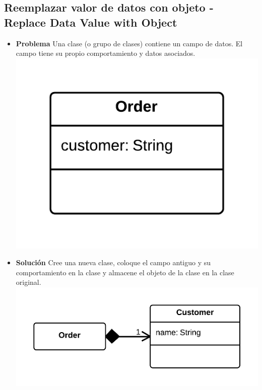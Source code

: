 \documentclass[11pt,a4paper,oneside]{book}
\begin{document}
\subsection{Reemplazar valor de datos con objeto - Replace Data Value with Object}
\label{replacedatavaluewithobject}
\begin{itemize}
    \item \textbf{Problema} Una clase (o grupo de clases) contiene un campo de datos. El campo tiene su propio comportamiento y datos asociados.\\
    \centering \includegraphics[scale=0.2]{replacedatavaluewithobjectproblem}
    \item \textbf{Solución} Cree una nueva clase, coloque el campo antiguo y su comportamiento en la clase y almacene el objeto de la clase en la clase original.\\
    \centering \includegraphics[scale=0.2]{replacedatavaluewithobjectsolution}
\end{itemize}
    
\end{document}
